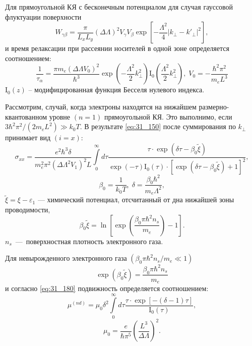 Для прямоугольной КЯ с бесконечным потенциалом для случая гауссовой флуктуации поверхности
\begin{equation} \label{eq:31_160}
W_{\gamma \beta } =\frac{\pi }{L_x L_y } (\Delta \Lambda )^2 V_{\gamma } V_{\beta } \exp \left[-\frac{\Lambda^2 }{4} \left|k_{\bot } -k'_{\bot } \right|^2 \right],
\end{equation}
и время релаксации при рассеянии носителей в одной зоне определяется соотношением:
\begin{equation} \label{eq:31_170}
\frac{1}{\tau _{\alpha } } =\frac{\pi m_e (\Delta \Lambda V_0 )^2 }{\hbar^3 } \exp \left(-\frac{\Lambda^2}{2} k_{\bot }^2 \right)\mathrm{I}_0 \left(\frac{\Lambda^2 }{2} k_{\bot }^2 \right), \;
V_0 =-\frac{\hbar^2 \pi^2 }{m_e L^3 }
\end{equation}
${\mathrm I}_0 (z)$ -- модифицированная функция Бесселя нулевого индекса.

Рассмотрим, случай, когда электроны находятся на нижайшем размерно-квантованном уровне $(n=1)$ прямоугольной КЯ. Это выполнимо, если $3\hbar ^{2} \pi ^{2} /\left(2m_e L^2 \right) \gg k_0 T$. В результате \eqref{eq:31_150} после суммирования по $k_{\bot } $ принимает вид $(i=x)$:
\begin{equation} \label{eq:31_180}
\sigma _{xx} =\frac{e^2 \hbar^3 \delta}{m_e^2 \pi^2 \left(\Delta \Lambda^2 V_1 \right)^2 L} \int\limits_0^\infty {d\tau \frac{\tau \cdot \exp \left(\delta \tau -\beta_0 \tilde{\xi }\right)}{\exp(-\tau )\mathrm{I}_0 (\tau )\cdot \left[\exp \left(\delta \tau -\beta_0 \tilde{\xi }\right)+1\right]^2 }},
\end{equation}
\[
\beta_0 = \frac{1}{k_0 T}, \; \delta =\frac{\beta_0 \hbar^2 }{m_e \Lambda^2 },
\] 
$\tilde{\xi }=\xi -\varepsilon _{1} $ --- химический потенциал, отсчитанный от дна нижайшей зоны проводимости,
\begin{equation} \label{eq:31_190}
\beta_0 \tilde{\xi }=\ln\left[\exp\left(\frac{\beta_0 \pi \hbar^2 n_s }{m_e} \right)-1\right].
\end{equation}
$n_s $~---~поверхностная плотность электронного газа.

Для невырожденного электронного газа $(\beta_0 \pi \hbar^2 n_s /m_e \ll 1)$
$$\exp(\beta_0 \tilde{\xi }) = \frac{\beta_0 \pi \hbar^2 n_s}{m_e} $$
и согласно \eqref{eq:31_180} подвижность определяется соотношением:
\begin{equation} \label{eq:31_200}
\mu ^{(nd)} =\mu _{0} \delta ^{2} \int\limits_0^\infty {d\tau \frac{\tau \cdot \exp \left[-\left(\delta -1\right)\tau \right]}{\mathrm{I}_0 (\tau )}},
\end{equation}
\[
\mu _{0} =\frac{e}{\hbar \pi^5 } \left(\frac{L^3 }{\Delta \Lambda } \right)^2.
\] 

